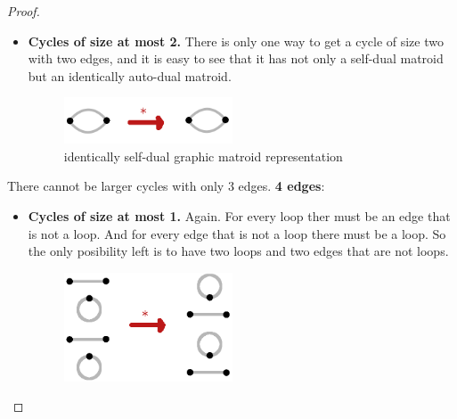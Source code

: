\begin{proof}
\begin{enumerate}[label=(\roman*)]
\begin{itemize}
                    \item \textbf{Cycles of size at most 2.}
                        There is only one way to get a cycle of size two with two edges, and it is easy to see that it has not only
                        a self-dual matroid but an identically auto-dual matroid.
                        
                        \begin{figure}[H]
                            \begin{center}
                            \includegraphics[width=5cm]{Test2/Problem1/2.png}
                            \caption{identically self-dual graphic matroid representation}
                            \label{t2:p1_2.png}
                            \end{center}                        
                        \end{figure}\pn
                \end{itemize}
                  
                There cannot be larger cycles with only 3 edges.\pn
            \textbf{4 edges}:\pn
            
                \begin{itemize}
                   \item \textbf{Cycles of size at most 1.}
                        Again. For every loop ther must be an edge that is not a loop. And for every edge that is not a loop there 
                        must be a loop. So the only posibility left is to have two loops and two edges that are not loops.
                        
                        \begin{figure}[H]
                            \begin{center}
                            \includegraphics[width=5cm]{Test2/Problem1/1_0-1_0.png}
                            \end{center}                        
                        \end{figure}\pn
                        

\end{itemize}
\end{enumerate}
\end{proof}
